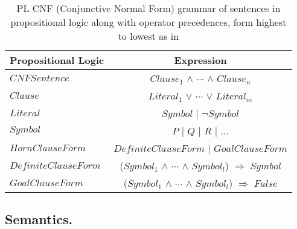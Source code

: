 \begin{table}
  \centering
  \begin{tabular}{lc}
    \toprule

    \textbf{Propositional Logic}  \hspace{1cm}   & \textbf{Expression}  \\
    \toprule
    
    $CNFSentence$ & $Clause_1$ $\wedge$ $\cdots$  $\wedge$ $Clause_n$ \\ \midrule
    $Clause$ & $Literal_1$  $\vee$ $\cdots$  $\vee$  $Literal_m$   \\ \midrule  
    $Literal$ & $Symbol$ | $\neg Symbol$    \\ \midrule
    $Symbol$ & \textit{$P$} | \textit{$Q$} | \textit{$R$} | ...  \\  \midrule

   
	 $HornClauseForm$ & $DefiniteClauseForm$ | $GoalClauseForm$    \\ 
	 $DefiniteClauseForm$ & ($Symbol_1$ $\wedge$ $\cdots$  $\wedge$ $Symbol_l$) $\Rightarrow$ $Symbol$   \\ 
	 $GoalClauseForm$ & ($Symbol_1$ $\wedge$ $\cdots$  $\wedge$ $Symbol_l$) $\Rightarrow$ $False$    \\   
   
    \bottomrule
  \end{tabular}
  \caption{PL CNF (Conjunctive Normal Form) grammar of sentences in propositional logic along with operator precedences, form highest to lowest as in \citep{russell2016artificial}}
  \label{table: BNF_Syntax}
\end{table}












\subsection{Semantics.}

%











